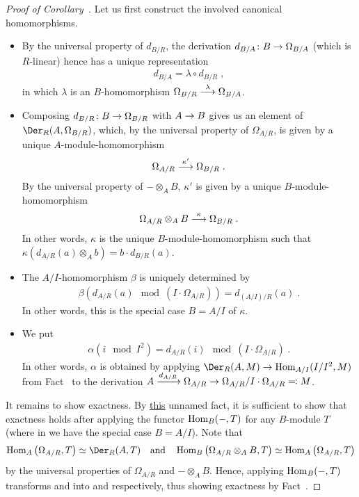 \documentclass[a4paper,parskip=half,numbers=enddot, DIV=12]{scrreprt}
\begin{document}
\begin{proof}[Proof of Corollary~]
	Let us first construct the involved canonical homomorphisms.
	\begin{itemize}
		\item 
		By the universal property of $d_{B/R}$, the derivation $d_{B/A}\colon B\morphism \Omega_{B/A}$ (which is $R$-linear) hence has a unique representation 
		\begin{align*}
			d_{B/A} = \lambda \circ d_{B/R}\;,
		\end{align*}
		in which $\lambda$ is an $B$-homomorphism $\Omega_{B/R}\morphism[\lambda]\Omega_{B/A}$.
		 \item 
		 Composing $d_{B/R}\colon B \morphism \Omega_{B/R}$ with $A\morphism B$ gives us an element of $\Der_R(A, \Omega_{B/R})$, which, by the universal property of $\Omega_{A/R}$, is given by a unique $A$-module-homomorphism 
		 \begin{align*}
		 	\Omega_{A/R} \morphism[\kappa'] \Omega_{B/R}\;.
		 \end{align*}
		 By the universal property of $-\otimes_A B$, $\kappa'$ is given by a unique $B$-module-homomorphism
		 \begin{align*}
		 	\Omega_{A/R} \otimes_A B \morphism[\kappa] \Omega_{B/R}\;.
		 \end{align*}
		 In other words, $\kappa$ is the unique $B$-module-homomorphism such that $\kappa(d_{A/R}(a)\otimes_A b) = b\cdot d_{B/R}(a)$.
		 \item 
		 The $A/I$-homomorphism $\beta$ is uniquely determined by 
		 \begin{align*}
		 	\beta\left(d_{A/R}(a) \mod (I\cdot \Omega_{A/R})\right) = d_{(A/I)/R}(a)\;.
		 \end{align*}
		 In other words, this is the special case $B=A/I$ of $\kappa$.
		 \item 
		 We put 
		 \begin{align*}
		 	\alpha(i\mod I^2) = d_{A/R}(i) \mod (I\cdot \Omega_{A/R})\;.
		 \end{align*}
		 In other words, $\alpha$ is obtained by applying $\Der_R(A,M) \morphism \Hom_{A/I} (I/I^2, M)$ from Fact~ to the derivation $A\xrightarrow{\smash{d}_{A/R}} \Omega_{A/R} \morphism \Omega_{A/R}/I \cdot \Omega_{A/R} \eqqcolon M$.
	\end{itemize}
	It remains to show exactness. By \hyperref[fact:HomRightExact]{this} unnamed fact, it is sufficient to show that exactness holds after applying the functor $\operatorname{Hom}_B(-,T)$ for any $B$-module $T$ (where in  we have the special case $B=A/I$). Note that 
	\begin{align*}
		\Hom_A\left(\Omega_{A/R},T\right)\simeq\Der_R(A,T)\quad\text{and}\quad \Hom_B\left(\Omega_{A/R}\otimes_AB,T\right)\simeq \Hom_A\left(\Omega_{A/R},T\right) 
	\end{align*}
	by the universal properties of $\Omega_{A/R}$ and $-\otimes_AB$. Hence, applying $\operatorname{Hom}_B(-,T)$ transforms  and  into  and  respectively, thus showing exactness by Fact~. 
\end{proof}
\end{document}
